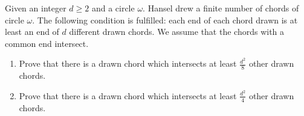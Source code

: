 Given an integer $d \ge 2$ and a circle $\omega$.
Hansel drew a finite number of chords of circle $\omega$.
The following condition is fulfilled: each end of each chord drawn is at least an end of $d$ different drawn chords.
We assume that the chords with a common end intersect.
\begin{enumerate}[label = (\alph*)]
  \item Prove that there is a drawn chord which intersects at least $\tfrac{d^2}{8}$ other drawn chords.
  \item Prove that there is a drawn chord which intersects at least $\tfrac{d^2}{4}$ other drawn chords.
\end{enumerate}
